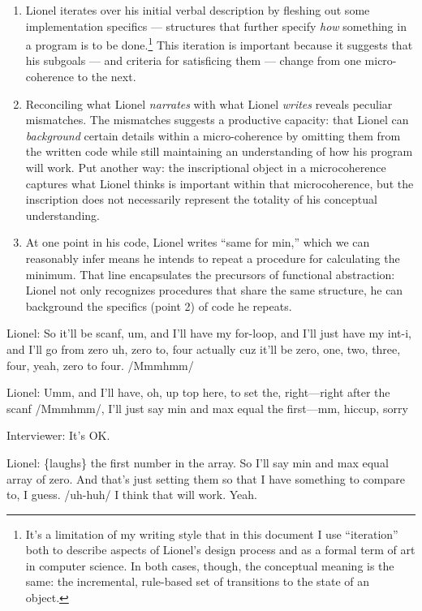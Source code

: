 \begin{enumerate}
\def\labelenumi{\arabic{enumi}.}
\item
  Lionel iterates over his initial verbal description by fleshing out
  some implementation specifics --- structures that further specify
  \emph{how} something in a program is to be done.\footnote{It's a
    limitation of my writing style that in this document I use
    ``iteration'' both to describe aspects of Lionel's design process
    and as a formal term of art in computer science. In both cases,
    though, the conceptual meaning is the same: the incremental,
    rule-based set of transitions to the state of an object.} This
  iteration is important because it suggests that his subgoals --- and
  criteria for satisficing them --- change from one micro-coherence to
  the next.
\item
  Reconciling what Lionel \emph{narrates} with what Lionel \emph{writes}
  reveals peculiar mismatches. The mismatches suggests a productive
  capacity: that Lionel can \emph{background} certain details within a
  micro-coherence by omitting them from the written code while still
  maintaining an understanding of how his program will work. Put another
  way: the inscriptional object in a microcoherence captures what Lionel
  thinks is important within that microcoherence, but the inscription
  does not necessarily represent the totality of his conceptual
  understanding.
\item
  At one point in his code, Lionel writes ``same for min,'' which we can
  reasonably infer means he intends to repeat a procedure for
  calculating the minimum. That line encapsulates the precursors of
  functional abstraction: Lionel not only recognizes procedures that
  share the same structure, he can background the specifics (point 2) of
  code he repeats.
\end{enumerate}

Lionel: So it'll be scanf, um, and I'll have my for-loop, and I'll just
have my int-i, and I'll go from zero uh, zero to, four actually cuz
it'll be zero, one, two, three, four, yeah, zero to four. /Mmmhmm/

Lionel: Umm, and I'll have, oh, up top here, to set the, right---right
after the scanf /Mmmhmm/, I'll just say min and max equal the
first---mm, hiccup, sorry

Interviewer: It's OK.

Lionel: \{laughs\} the first number in the array. So I'll say min and
max equal array of zero. And that's just setting them so that I have
something to compare to, I guess. /uh-huh/ I think that will work. Yeah.

